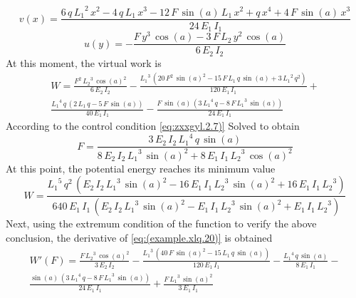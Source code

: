\begin{equation}\label{eq:(5.jxz.16)}
v(x)=\frac{6\,q\,{L_1 }^2 \,x^2 -4\,q\,L_1 \,x^3 -12\,F\,\sin \left(a\right)\,L_1 \,x^2 +q\,x^4 +4\,F\,\sin \left(a\right)\,x^3 }{24\,E_1 \,I_1 }
\end{equation}
\begin{equation}\label{eq:(5.jxz.17)}
u(y)=-\frac{F\,y^3 \,\cos \left(a\right)-3\,F\,L_2 \,y^2 \,\cos \left(a\right)}{6\,E_2 \,I_2 }
\end{equation}
At this moment, the virtual work is
\begin{multline}\label{eq:(5.jxz.18)}
W=\frac{F^2 \,{L_2 }^3 \,{\cos \left(a\right)}^2 }{6\,E_2 \,I_2 }-\frac{{L_1 }^3 \,{\left(20\,F^2 \,{\sin \left(a\right)}^2 -15\,F\,L_1 \,q\,\sin \left(a\right)+3\,{L_1 }^2 \,q^2 \right)}}{120\,E_1 \,I_1 }+
\\\frac{{L_1 }^4 \,q\,{\left(2\,L_1 \,q-5\,F\,\sin \left(a\right)\right)}}{40\,E_1 \,I_1 }-\frac{F\,\sin \left(a\right)\,{\left(3\,{L_1 }^4 \,q-8\,F\,{L_1 }^3 \,\sin \left(a\right)\right)}}{24\,E_1 \,I_1 }
\end{multline}
According to the control condition \ref{eq:zxxgyl.2.7)}
Solved to obtain
\begin{equation}\label{eq:(jxz.5.19)}
F=\frac{3\,E_2 \,I_2 \,{L_1 }^4 \,q\,\sin \left(a\right)}{8\,E_2 \,I_2 \,{L_1 }^3 \,{\sin \left(a\right)}^2 +8\,E_1 \,I_1 \,{L_2 }^3 \,{\cos \left(a\right)}^2 }
\end{equation}
At this point, the potential energy reaches its minimum value
\begin{equation}\label{eq:(example.xlq.20)}
W=\frac{{L_1 }^5 \,q^2 \,{\left(E_2 \,I_2 \,{L_1 }^3 \,{\sin \left(a\right)}^2 -16\,E_1 \,I_1 \,{L_2 }^3 \,{\sin \left(a\right)}^2 +16\,E_1 \,I_1 \,{L_2 }^3 \right)}}{640\,E_1 \,I_1 \,{\left(E_2 \,I_2 \,{L_1 }^3 \,{\sin \left(a\right)}^2 -E_1 \,I_1 \,{L_2 }^3 \,{\sin \left(a\right)}^2 +E_1 \,I_1 \,{L_2 }^3 \right)}}
\end{equation}
Next, using the extremum condition of the function to verify the above conclusion, the derivative of \ref{eq:(example.xlq.20)} is obtained
\begin{multline}\label{eq:(example.xlq.21)}
W'(F)= \frac{F\,{L_2 }^3 \,{\cos \left(a\right)}^2 }{3\,E_2 \,I_2 }-\frac{{L_1 }^3 \,{\left(40\,F\,{\sin \left(a\right)}^2 -15\,L_1 \,q\,\sin \left(a\right)\right)}}{120\,E_1 \,I_1 }-\frac{{L_1 }^4 \,q\,\sin \left(a\right)}{8\,E_1 \,I_1 }-
\\\frac{\sin \left(a\right)\,{\left(3\,{L_1 }^4 \,q-8\,F\,{L_1 }^3 \,\sin \left(a\right)\right)}}{24\,E_1 \,I_1 }+\frac{F\,{L_1 }^3 \,{\sin \left(a\right)}^2 }{3\,E_1 \,I_1 }
\end{multline}
